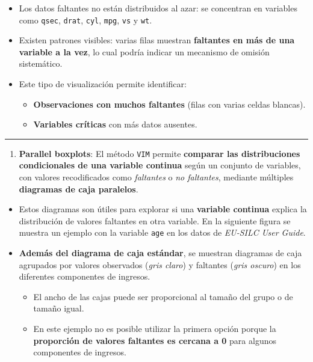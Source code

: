\documentclass[
]{book}
\providecommand{\tightlist}{%
  \setlength{\itemsep}{0pt}\setlength{\parskip}{0pt}}
\begin{document}
\begin{itemize}
\tightlist
\item
  Los datos faltantes no están distribuidos al azar: se concentran en variables como \texttt{qsec}, \texttt{drat}, \texttt{cyl}, \texttt{mpg}, \texttt{vs} y \texttt{wt}.\\
\item
  Existen patrones visibles: varias filas muestran \textbf{faltantes en más de una variable a la vez}, lo cual podría indicar un mecanismo de omisión sistemático.\\
\item
  Este tipo de visualización permite identificar:

  \begin{itemize}
  \tightlist
  \item
    \textbf{Observaciones con muchos faltantes} (filas con varias celdas blancas).\\
  \item
    \textbf{Variables críticas} con más datos ausentes.
  \end{itemize}
\end{itemize}

\begin{center}\rule{0.5\linewidth}{0.5pt}\end{center}

\begin{enumerate}
\def\labelenumi{\arabic{enumi}.}
\setcounter{enumi}{5}
\tightlist
\item
  \textbf{Parallel boxplots}: El método \texttt{VIM} permite \textbf{comparar las distribuciones condicionales de una variable continua} según un conjunto de variables, con valores recodificados como \emph{faltantes} o \emph{no faltantes}, mediante múltiples \textbf{diagramas de caja paralelos}.\\
\end{enumerate}

\begin{itemize}
\item
  Estos diagramas son útiles para explorar si una \textbf{variable continua} explica la distribución de valores faltantes en otra variable. En la siguiente figura se muestra un ejemplo con la variable \texttt{age} en los datos de \emph{EU-SILC User Guide}.
\item
  \textbf{Además del diagrama de caja estándar}, se muestran diagramas de caja agrupados por valores observados (\emph{gris claro}) y faltantes (\emph{gris oscuro}) en los diferentes componentes de ingresos.

  \begin{itemize}
  \tightlist
  \item
    El ancho de las cajas puede ser proporcional al tamaño del grupo o de tamaño igual.\\
  \item
    En este ejemplo no es posible utilizar la primera opción porque la \textbf{proporción de valores faltantes es cercana a 0} para algunos componentes de ingresos.
  \end{itemize}
\end{itemize}
\end{document}
